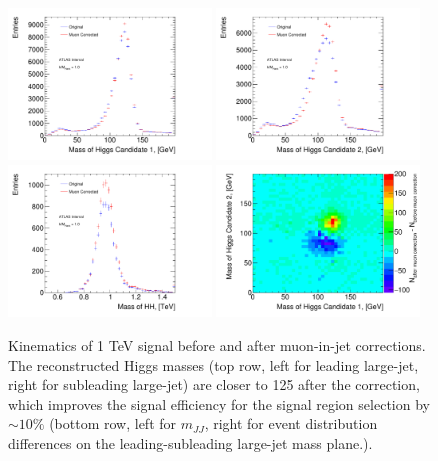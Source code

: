 \begin{figure}
\begin{center}
  \includegraphics[width=0.48\textwidth]{figures/boosted/muons/h1_mass_dbl.pdf}
  \includegraphics[width=0.48\textwidth]{figures/boosted/muons/h2_mass_dbl.pdf}
  \includegraphics[width=0.48\textwidth]{figures/boosted/muons/hh_mass_dbl.pdf}
  \includegraphics[width=0.48\textwidth]{figures/boosted/muons/h12_corr_mass.pdf}
  \caption{Kinematics of 1 TeV signal before and after muon-in-jet corrections. The reconstructed Higgs masses (top row, left for leading large-\R jet, right for subleading large-\R jet) are closer to 125 \GeV after the correction, which improves the signal efficiency for the signal region selection by $\sim\!10\%$ (bottom row, left for $m_{JJ}$, right for event distribution differences on the leading-subleading large-\R jet mass plane.).}
  \label{fig:boosted-muons-signal}
\end{center}
\end{figure}

